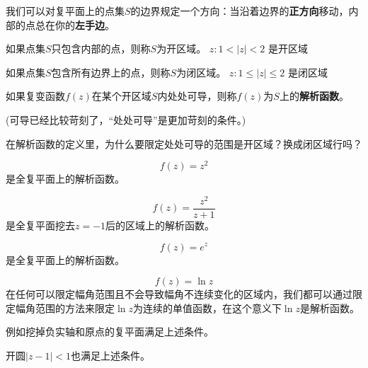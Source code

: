 \documentclass[CJK]{beamer}
\begin{document}
\begin{frame}
  \bch
  我们可以对复平面上的点集$S$的边界规定一个方向：当沿着边界的{\bf 正方向}移动，{内部的点}总在你的{\bf 左手边}。
  \ech
\end{frame}

\begin{frame}
  \bch
  \bitem
  \item
 { 如果点集$S$只包含内部的点，则称$S$为开区域。
  \bex
  ${z: 1<|z|<2}$
  是开区域
  \eex
 }
 \item{
  如果点集$S$包含所有边界上的点，则称$S$为闭区域。
  \bex
  ${z: 1\le |z|\le 2}$
  是闭区域
  \eex
 }
   \eitem
  \ech
\end{frame}

\begin{frame}
  \bch
  如果复变函数$f(z)$在某个开区域$S$内处处可导，则称$f(z)$为$S$上的{\bf 解析函数}。

  \skiplines
  
  (可导已经比较苛刻了，“处处可导”是更加苛刻的条件。)
  \ech
\end{frame}


\begin{frame}
  \bch
  
  在解析函数的定义里，为什么要限定处处可导的范围是开区域？换成闭区域行吗？
  \ech
\end{frame}


\begin{frame}
  \bch
  \bex
  $$f(z) = z^2$$
  是全复平面上的解析函数。
  \eex
  \ech
\end{frame}

\begin{frame}
  \bch
  \bex
  $$f(z) = \frac{z^2}{z+1}$$
  是全复平面挖去$z=-1$后的区域上的解析函数。
  \eex
  \ech
\end{frame}

\begin{frame}
  \bch
  \bex
  $$f(z) = e^z$$
  是全复平面上的解析函数。
  \eex
  \ech
\end{frame}


\begin{frame}
  \bch
  \bex
  $$f(z) = \ln z$$
  在任何可以限定幅角范围且不会导致幅角不连续变化的区域内，我们都可以通过限定幅角范围的方法来限定$\ln z$为连续的单值函数，在这个意义下$\ln z$是解析函数。

  \skiplines
  
  例如挖掉负实轴和原点的复平面满足上述条件。

  开圆$|z-1|<1$也满足上述条件。

  \eex
  \ech
\end{frame}
\end{document}
